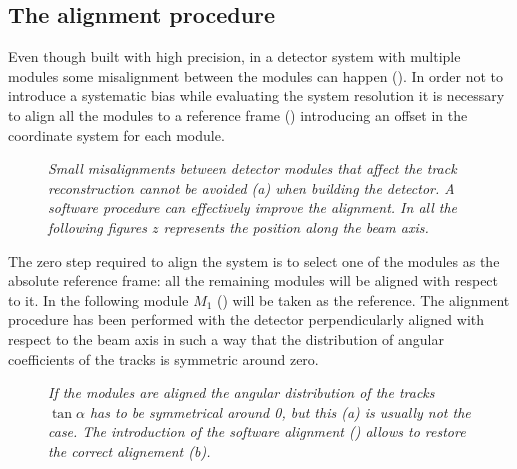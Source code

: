 
\subsection{The alignment procedure}
Even though built with high precision, in a detector system with multiple
modules some misalignment between the modules can happen
(). In order not to introduce a systematic bias
while evaluating the system resolution it is necessary to align all the modules
to a reference frame () introducing an offset in the coordinate system for each module.\\
\begin{figure}[!htbp]
  \centering 
  \subfloat[] {  \label{fig:module_misalignment}}
  \subfloat[] {  \label{fig:module_alignment}}
  \caption{ \it Small misalignments between detector modules that affect the
    track reconstruction cannot be avoided (a) when building the detector. A
    software procedure can effectively improve the alignment. In all the
    following figures $z$ represents the position along the beam axis.
  }\label{tikz:module_alignment}
\end{figure}
The zero step required to align the system is to select one of the modules as
the absolute reference frame: all the remaining modules will be aligned with
respect to it. In the following module $M_1$ () will
be taken as the reference. The alignment procedure has been performed with the
detector perpendicularly aligned with respect to the beam axis in such a way
that the distribution of angular coefficients of the tracks is symmetric around
zero.\\
\begin{figure}[!htbp]
  \centering 
  \subfloat[] {  \label{fig:align13_a}}
  \subfloat[] {  \label{fig:align13_b}} 
  \caption{\it If the modules are aligned the angular distribution of the tracks
    $\tan{\alpha}$ has to be symmetrical around 0, but this (a) is usually not
    the case. The introduction of the software alignment ()
    allows to restore the correct alignement (b).}
  \label{fig:align13}
\end{figure} 
